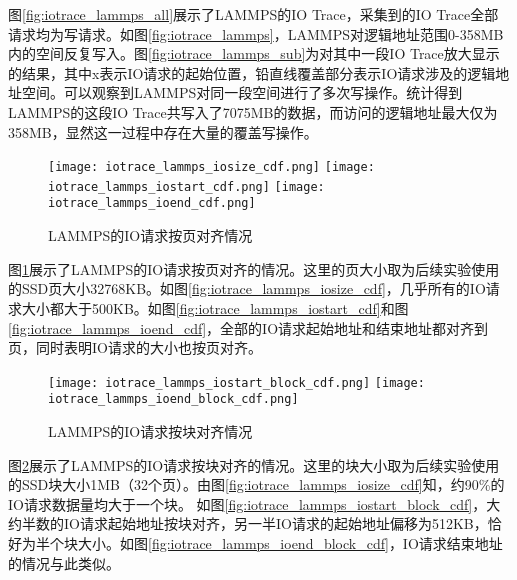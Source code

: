 图\ref{fig:iotrace_lammps_all}展示了LAMMPS的IO Trace，采集到的IO Trace全部请求均为写请求。如图\ref{fig:iotrace_lammps}，LAMMPS对逻辑地址范围0-358MB内的空间反复写入。图\ref{fig:iotrace_lammps_sub}为对其中一段IO Trace放大显示的结果，其中x表示IO请求的起始位置，铅直线覆盖部分表示IO请求涉及的逻辑地址空间。可以观察到LAMMPS对同一段空间进行了多次写操作。统计得到LAMMPS的这段IO Trace共写入了7075MB的数据，而访问的逻辑地址最大仅为358MB，显然这一过程中存在大量的覆盖写操作。

\begin{figure}[H]
  \centering
    {\texttt{[image: iotrace\_lammps\_iosize\_cdf.png]}}
  \hspace{1em}
      {\texttt{[image: iotrace\_lammps\_iostart\_cdf.png]}}
      \hspace{1em}
          {\texttt{[image: iotrace\_lammps\_ioend\_cdf.png]}}
  \caption{LAMMPS的IO请求按页对齐情况}
  \label{fig:iotrace_lammps_iocdf}
\end{figure}
图\ref{fig:iotrace_lammps_iocdf}展示了LAMMPS的IO请求按页对齐的情况。这里的页大小取为后续实验使用的SSD页大小32768KB。如图\ref{fig:iotrace_lammps_iosize_cdf}，几乎所有的IO请求大小都大于500KB。如图\ref{fig:iotrace_lammps_iostart_cdf}和图\ref{fig:iotrace_lammps_ioend_cdf}，全部的IO请求起始地址和结束地址都对齐到页，同时表明IO请求的大小也按页对齐。

\begin{figure}[H]
  \centering
      {\texttt{[image: iotrace\_lammps\_iostart\_block\_cdf.png]}}
      \hspace{1em}
          {\texttt{[image: iotrace\_lammps\_ioend\_block\_cdf.png]}}
  \caption{LAMMPS的IO请求按块对齐情况}
  \label{fig:iotrace_lammps_iocdf_block}
\end{figure}

图\ref{fig:iotrace_lammps_iocdf_block}展示了LAMMPS的IO请求按块对齐的情况。这里的块大小取为后续实验使用的SSD块大小1MB（32个页）。由图\ref{fig:iotrace_lammps_iosize_cdf}知，约90\%的IO请求数据量均大于一个块。 如图\ref{fig:iotrace_lammps_iostart_block_cdf}，大约半数的IO请求起始地址按块对齐，另一半IO请求的起始地址偏移为512KB，恰好为半个块大小。如图\ref{fig:iotrace_lammps_ioend_block_cdf}，IO请求结束地址的情况与此类似。

